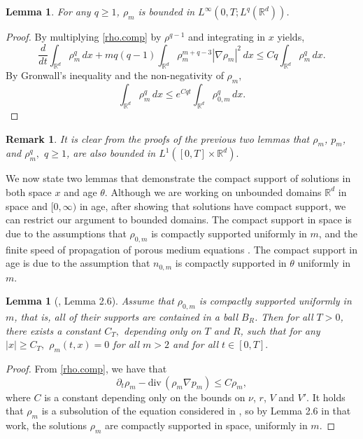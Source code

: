 \documentclass{amsart}
\newtheorem{lemma}[theorem]{Lemma}
\newtheorem{remark}[theorem]{Remark}
\def\R{\mathbb R}
\def\div{\mathrm{div}\,}
\begin{document}
\begin{lemma}\label{q.lemma}
    For any $q\geq1$, $\rho_m$ is bounded in $L^\infty(0,T;L^q(\R^d))$.
\end{lemma}
\begin{proof}
    By multiplying \eqref{rho.comp} by $\rho^{q-1}$ and integrating in $x$ yields,
    \begin{equation}\label{q.norm}
        \frac{d}{dt}\int_{\R^d}\rho_m^q \, dx +mq(q-1)\int_{\R^d}\rho_m^{m+q-3}|\nabla \rho_m|^2 \, dx \leq Cq\int_{\R^d}\rho_m^q\, dx.
    \end{equation}
    By Gronwall's inequality and the non-negativity of $\rho_m,$
    \begin{equation*}
        \int_{\R^d}\rho_m^q \,dx\leq e^{Cqt}\int_{\R^d}\rho_{0,m}^q\, dx.
    \end{equation*}
\end{proof}
\begin{remark}
    It is clear from the proofs of the previous two lemmas that $\rho_m$, $p_m$, and $\rho_m^q,$ $q \geq 1$, are also bounded in $L^1([0,T]\times \R^d).$
\end{remark}
We now state two lemmas that demonstrate the compact support of solutions in both space $x$ and age $\theta$. Although we are working on unbounded domains $\R^d$ in space and $[0,\infty)$ in age, after showing that solutions have compact support, we can restrict our argument to bounded domains. The compact support in space is due to the assumptions that $\rho_{0,m}$ is compactly supported uniformly in $m$, and the finite speed of propagation of porous medium equations \cite{pme}. The compact support in age is due to the assumption that $n_{0,m}$ is compactly supported in $\theta$ uniformly in $m$.
\begin{lemma}[\cite{PerthameQuiros2014}, Lemma 2.6]\label{lem.cptspt}
    Assume that $\rho_{0,m}$ is compactly supported uniformly in $m$, that is, all of their supports are contained in a ball $B_R$. Then for all $T>0$, there exists a constant $C_T,$ depending only on $T$ and $R$, such that for any $|x|\geq C_T,$ $\rho_m(t,x)=0$ for all $m>2$ and for all $t \in [0,T].$
\end{lemma}
\begin{proof}
    From \eqref{rho.comp}, we have that
    $$
    \partial_t \rho_m -\div(\rho_m \nabla p_m)\leq C\rho_m,
    $$
    where $C$ is a constant depending only on the bounds on $\nu$, $r$, $V$ and $V'$. It holds that $\rho_m$ is a subsolution of the equation considered in \cite{PerthameQuiros2014}, so by Lemma 2.6 in that work, the solutions $\rho_m$ are compactly supported in space, uniformly in $m$.
\end{proof}
\end{document}
